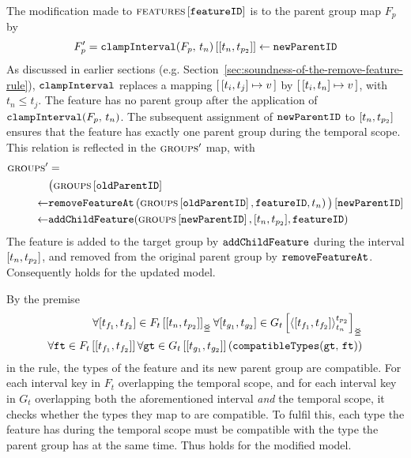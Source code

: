 The modification made to $\textsc{features} \left[ \texttt{featureID} \right]$ is to the parent group map $F_p$ by 
\[
   F_p' = \lookup{\var{clampInterval}(F_p, \, t_n)}{\interval{t_n}{t_{p_2}}} \assign \var{newParentID}
\]
As discussed in earlier sections (e.g. Section~\vref{sec:soundness-of-the-remove-feature-rule}), $\texttt{clampInterval}$ replaces a mapping $\intervalmapping{t_i}{t_j}{v}$ by $\intervalmapping{t_i}{t_n}{v}$, with $t_n \leq t_j$. The feature has no parent group  after the application of $\texttt{clampInterval}(F_p, \, t_n)$. The subsequent assignment of $\texttt{newParentID}$ to $\interval{t_n}{t_{p_2}}$ ensures that the feature has exactly one parent group during the temporal scope. This relation is reflected in the $\textsc{groups}{}{}'$ map, with
\begin{align*}
   \groups' &= \\
   \lookup{&\big(\lookup{\groups{}}{\var{oldParentID}} \\
   \assign & \var{removeFeatureAt}\left(\lookup{\groups{}}{\var{oldParentID}}, \var{featureID}, t_n\right)\big)}{\var{newParentID}} \\
   \assign& \var{addChildFeature}(\lookup{\groups{}}{\var{newParentID}}, \interval{t_n}{t_{p_2}}, \var{featureID})
\end{align*}
The feature is added to the target group by $\texttt{addChildFeature}$ during the interval $\interval{t_n}{t_{p_2}}$, and removed from the original parent group by $\texttt{removeFeatureAt}$. Consequently  holds for the updated model. 

By the premise
\[
   \begin{split}
      \forall \interval{t_{f_1}}{t_{f_2}} \in \overlapping{F_t}{t_n}{t_{p_2}}
      \forall \interval{t_{g_1}}{t_{g_2}} \in \lookup{G_t}{\clamp{\interval{t_{f_1}}{t_{f_2}}}{t_n}{t_{p_2}}}_{\overlap{}} \\
         \forall \var{ft} \in \lookup{F_t}{\interval{t_{f_1}}{t_{f_2}}}
         \forall \var{gt} \in \lookup{G_t}{\interval{t_{g_1}}{t_{g_2}}}
         \left(\var{compatibleTypes}(\var{gt},\, \var{ft}) \right)
   \end{split}
\]
in the rule, the types of the feature and its new parent group are compatible. For each interval key in $F_t$ overlapping the temporal scope, and for each interval key in $G_t$ overlapping both the aforementioned interval \emph{and} the temporal scope, it checks whether the types they map to are compatible. To fulfil this, each type the feature has during the temporal scope must be compatible with the type the parent group has at the same time. Thus  holds for the modified model.

